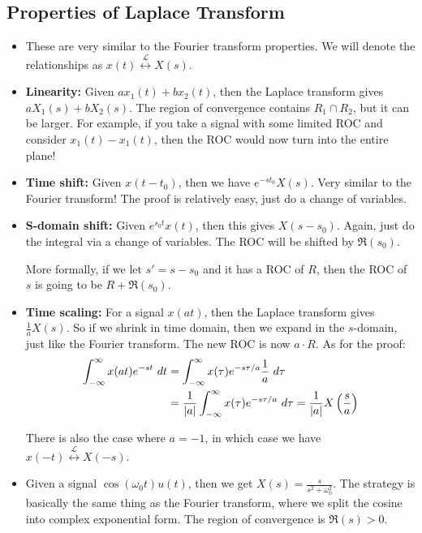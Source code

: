 \subsection{Properties of Laplace Transform}
\begin{itemize}
	\item These are very similar to the Fourier transform properties. We will denote the relationships 
		as \( x(t) \overset{\mathcal L}{\leftrightarrow} X(s) \). 
	\item \textbf{Linearity:} Given  \( ax_1(t) + bx_2(t) \), then the Laplace transform gives \( aX_1(s) + bX_2(s) \).
		The region of convergence contains \( R_1 \cap R_2 \), but it can be larger. For example, if you take 
		a signal with some limited ROC and consider  \( x_1(t) - x_1(t) \), then the ROC would now turn into the 
		entire plane!
	\item \textbf{Time shift:} Given \( x(t - t_0) \), then we have \( e^{-st_0}X(s) \). Very similar to 
		the Fourier transform! The proof is relatively easy, just do a change of variables. 
	\item \textbf{S-domain shift:} Given \( e^{s_0 t} x(t) \), then this gives  \( X(s - s_0) \). Again, just 
		do the integral via a change of variables. The ROC will be shifted by \( \Re(s_0) \). 

		More formally, if we let \( s' = s - s_0 \) and it has a ROC of \( R \), then the ROC of \( s \) is 
		going to be \( R + \Re(s_0) \). 
	\item \textbf{Time scaling:} For a signal \( x(at) \), then the Laplace transform gives  \( \frac{1}{a}X(s) \).
		So if we shrink in time domain, then we expand in the \( s \)-domain, just like the Fourier transform.
		The new ROC is now \( a \cdot R \). As for the proof:
		\begin{align*}
			\int_{-\infty}^{\infty} x(at) e^{-st} \ d t  &=  \int_{-\infty}^{\infty} x(\tau) 
			e^{-s \tau / a} \frac{1}{a} \ d \tau \\
			&= \frac{1}{|a|}\int_{-\infty}^{\infty} x(\tau) e^{-s \tau / a} \ d \tau = \frac{1}{|a|}
			X\left( \frac{s}{a} \right) 
		\end{align*}
		
		There is also the case where \( a = -1 \), in which case we have \( x(-t) \overset{\mathcal L}
		{\leftrightarrow} X(-s)\). 
	\item Given a signal \( \cos(\omega_0 t) u(t) \), then we get \( X(s) = \frac{s}{s^2 + \omega_0^2} \). The strategy
		is basically the same thing as the Fourier transform, where we split the cosine into 
		complex exponential form. The region of convergence is \( \Re(s) > 0 \).


\end{itemize}
